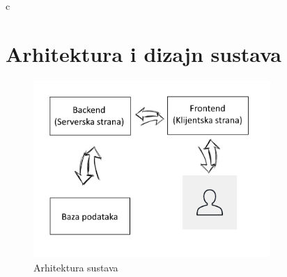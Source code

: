 		c\chapter{Arhitektura i dizajn sustava}
		
		\begin{figure}[h]
		\centering
		\includegraphics[width=0.8\textwidth]{arhitektura-slika}
		\caption{Arhitektura sustava}
		\end{figure}
			

